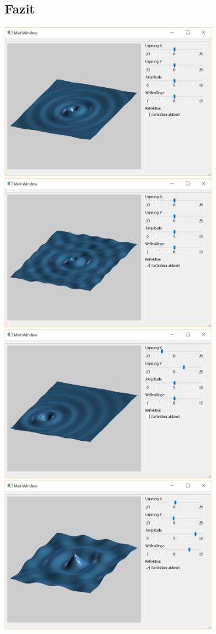 \documentclass[12pt,a4paper]{scrartcl}
\begin{document}
\subsection{Fazit}
\includegraphics[width=0.7\textwidth]{Images/Wave1.jpg}
\includegraphics[width=0.7\textwidth]{Images/WavewithReflextion.jpg}
\includegraphics[width=0.7\textwidth]{Images/xAndy.jpg}
\includegraphics[width=0.7\textwidth]{Images/HighaAndl.jpg}
\end{document}
